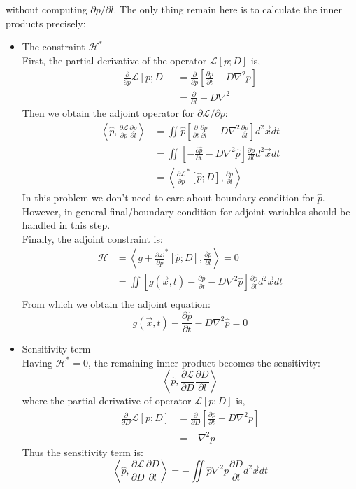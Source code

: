 \documentclass[11pt]{article}
\def\Dpartial#1#2{ \frac{\partial #1}{\partial #2} }
\newcommand{\vx}{\vec{x}}
\newcommand{\ph}{\hat{p}}
\newcommand{\inprod}[2]{\left\langle#1,#2\right\rangle}
\newcommand{\cH}{\mathcal{H}}
\newcommand{\cL}{\mathcal{L}}
\begin{document}
without computing $\partial p/\partial l$.
The only thing remain here is to calculate the inner products precisely:
\begin{itemize}
\item The constraint $\cH^*$\\
First, the partial derivative of the operator $\cL[p;D]$ is,
\begin{equation*}
\begin{split}
\Dpartial{}{p}\cL[p;D] &= \Dpartial{}{p}\left[ \Dpartial{p}{t} - D\nabla^2p \right]\\
&= \Dpartial{}{t} - D\nabla^2
\end{split}
\end{equation*}
Then we obtain the adjoint operator for $\partial\cL/\partial p$:
\begin{equation*}
\begin{split}
\inprod{\ph}{\Dpartial{\cL}{p}\Dpartial{p}{l}} &= \iint \ph\left[ \Dpartial{}{t}\Dpartial{p}{l} - D\nabla^2\Dpartial{p}{l} \right] d^2\vx dt\\
&= \iint \left[ -\Dpartial{\ph}{t} - D\nabla^2\ph \right]\Dpartial{p}{l} d^2\vx dt\\
&= \inprod{\Dpartial{\cL}{p}^*[\ph;D]}{\Dpartial{p}{l}}
\end{split}
\end{equation*}
In this problem we don't need to care about boundary condition for $\ph$.
However, in general final/boundary condition for adjoint variables should be handled in this step.\\
Finally, the adjoint constraint is:
\begin{equation*}
\begin{split}
\cH &= \inprod{g+\Dpartial{\cL}{p}^*[\ph;D]}{\Dpartial{p}{l}} = 0\\
&= \iint \left[ g(\vx,t) -\Dpartial{\ph}{t} - D\nabla^2\ph \right]\Dpartial{p}{l} d^2\vx dt\\
\end{split}
\end{equation*}
From which we obtain the adjoint equation:
\begin{equation}
g(\vx,t) - \Dpartial{\ph}{t} - D\nabla^2\ph = 0
\end{equation}
\item Sensitivity term\\
Having $\cH^*=0$, the remaining inner product becomes the sensitivity:
\begin{equation*}
\inprod{\ph}{\Dpartial{\cL}{D}\Dpartial{D}{l}}
\end{equation*}
where the partial derivative of operator $\cL[p;D]$ is,
\begin{equation*}
\begin{split}
\Dpartial{}{D}\cL[p;D] &= \Dpartial{}{D}\left[ \Dpartial{p}{t} - D\nabla^2p \right]\\
&= -\nabla^2p
\end{split}
\end{equation*}
Thus the sensitivity term is:
\begin{equation}
\inprod{\ph}{\Dpartial{\cL}{D}\Dpartial{D}{l}} = -\iint \ph\nabla^2p\Dpartial{D}{l} d^2\vx dt
\end{equation}
\end{itemize}

\printbibliography
\end{document}
